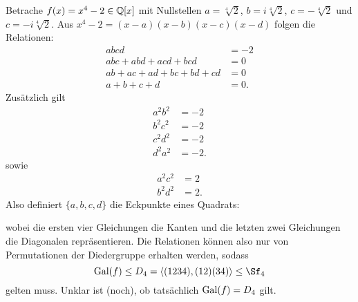\begin{beispiel}
Betrache $f(x) = x^4-2 \in \mathbb{Q}[x]$ mit Nullstellen $a = \sqrt[4]{2}$, $b= i \sqrt[4]{2}$, $c=- \sqrt[4]{2}$ und $c=-i \sqrt[4]{2}$. Aus $x^4-2= (x-a)(x-b)(x-c)(x-d)$ folgen die Relationen:
\begin{equation}
\begin{split}
abcd &= -2\\
abc+abd+acd+bcd &= 0 \\
ab+ac+ad+bc+bd+cd &= 0\\
a+b+c+d &= 0.
\end{split}
\end{equation}
Zusätzlich gilt
\begin{equation}
\begin{split}
a^2b^2 &= -2\\
b^2c^2 &= -2\\
c^2d^2 &= -2\\
d^2a^2 &= -2.
\end{split}
\end{equation}
sowie
\begin{equation}
\begin{split}
a^2c^2 &= 2\\
b^2d^2 &= 2.
\end{split}
\end{equation}
Also definiert $\{a,b,c,d\}$ die Eckpunkte eines Quadrats:
\begin{center}
\end{center}
wobei die ersten vier Gleichungen die Kanten und die letzten zwei Gleichungen die Diagonalen repräsentieren. Die Relationen können also nur von Permutationen der Diedergruppe erhalten werden, sodass 
\begin{equation}
\Gal (f) \leq D_4 = \langle (1234), (12)(34) \rangle \leq \Sf_4
\end{equation}
gelten muss. Unklar ist (noch), ob tatsächlich $\operatorname{\text{Gal}} (f) = D_4$ gilt.
\end{beispiel}
